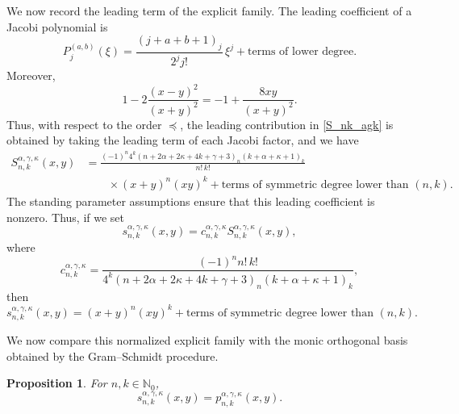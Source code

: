 \documentclass[reqno,10pt]{amsart}
\theoremstyle{plain}
\newtheorem{proposition}[theorem]{Proposition}
\numberwithin{equation}{section}
\numberwithin{figure}{section}
\begin{document}
We now record the leading term of the explicit family. The leading
coefficient of a Jacobi polynomial is
\[
P_j^{(a,b)}(\xi)
=
\frac{(j+a+b+1)_j}{2^j j!}\,\xi^j
+
\text{terms of lower degree}.
\]
Moreover,
\[
1-2\frac{(x-y)^2}{(x+y)^2}
=
-1+\frac{8xy}{(x+y)^2}.
\]
Thus, with respect to the order \(\preceq\), the leading contribution in
\eqref{S_nk_agk} is obtained by taking the leading term of each Jacobi
factor, and we have
\begin{align*}
S_{n,k}^{\alpha,\gamma,\kappa}(x,y)
&=
\frac{(-1)^n4^k
(n+2\alpha+2\kappa+4k+\gamma+3)_n
(k+\alpha+\kappa+1)_k}
{n!\,k!}
\\
&\qquad\times
(x+y)^n(xy)^k
+
\text{terms of symmetric degree lower than }(n,k).
\end{align*}
The standing parameter assumptions ensure that this leading coefficient
is nonzero.
Thus, if we set
\begin{equation*}%
s_{n,k}^{\alpha,\gamma,\kappa}(x,y)
=
c_{n,k}^{\alpha,\gamma,\kappa}
S_{n,k}^{\alpha,\gamma,\kappa}(x,y),
\end{equation*}
where
\[
c_{n,k}^{\alpha,\gamma,\kappa}
=
\frac{(-1)^n n!\,k!}
{4^k
(n+2\alpha+2\kappa+4k+\gamma+3)_n
(k+\alpha+\kappa+1)_k},
\]
then
\[
s_{n,k}^{\alpha,\gamma,\kappa}(x,y)
=
(x+y)^n(xy)^k
+
\text{terms of symmetric degree lower than }(n,k).
\]

We now compare this normalized explicit family with the monic orthogonal
basis obtained by the Gram--Schmidt procedure.

\begin{proposition}%
For $n,k\in\mathbb{N}_0$,
\[
s_{n,k}^{\alpha,\gamma,\kappa}(x,y)
=
p_{n,k}^{\alpha,\gamma,\kappa}(x,y).
\]
\end{proposition}
\end{document}
